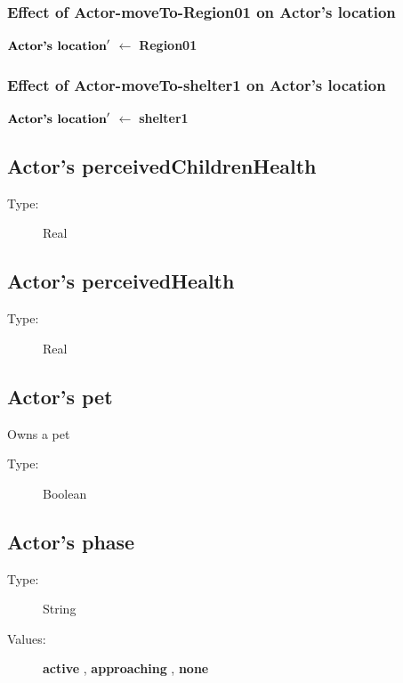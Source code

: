 \documentclass{article}%
\begin{document}
%
\subsubsection{Effect of Actor{-}moveTo{-}Region01 on Actor's location}%
\label{ssubsec:Effect of Actor{-}moveTo{-}Region01 on Actor's location}%
\begin{flushleft}%
$\mbox{\textbf{Actor's location}} '$%
$\leftarrow$%
\textbf{Region01}%
\end{flushleft}

%
\subsubsection{Effect of Actor{-}moveTo{-}shelter1 on Actor's location}%
\label{ssubsec:Effect of Actor{-}moveTo{-}shelter1 on Actor's location}%
\begin{flushleft}%
$\mbox{\textbf{Actor's location}} '$%
$\leftarrow$%
\textbf{shelter1}%
\end{flushleft}

%
\subsection{Actor's perceivedChildrenHealth}%
\label{subsec:Actor's perceivedChildrenHealth}%
\begin{description}%
\item[Type:]%
Real%
\end{description}

%
\subsection{Actor's perceivedHealth}%
\label{subsec:Actor's perceivedHealth}%
\begin{description}%
\item[Type:]%
Real%
\end{description}

%
\subsection{Actor's pet}%
\label{subsec:Actor's pet}%
Owns a pet%
\begin{description}%
\item[Type:]%
Boolean%
\end{description}

%
\subsection{Actor's phase}%
\label{subsec:Actor's phase}%
\begin{description}%
\item[Type:]%
String%
\item[Values:]%
\textbf{active}%
, %
\textbf{approaching}%
, %
\textbf{none}%
\end{description}
\end{document}
